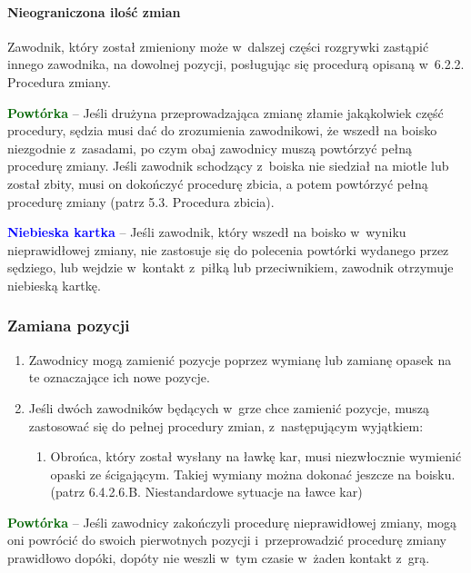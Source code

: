 \documentclass[12pt]{article}
\newcommand\bluecard[1]{\bgroup\textcolor{blue}{\textbf{#1}}}
\newcommand\other[1]{\bgroup\textcolor{darkgreen}{\textbf{#1}}}
\begin{document}
\paragraph{Nieograniczona ilość zmian}
Zawodnik, który został
zmieniony może w~dalszej części rozgrywki zastąpić innego zawodnika, na
dowolnej pozycji, posługując się procedurą opisaną w~6.2.2. Procedura
zmiany.

\other{Powtórka} -- Jeśli drużyna przeprowadzająca zmianę złamie
jakąkolwiek część procedury, sędzia musi dać do zrozumienia zawodnikowi,
że wszedł na boisko niezgodnie z~zasadami, po czym obaj zawodnicy muszą
powtórzyć pełną procedurę zmiany. Jeśli zawodnik schodzący z~boiska nie
siedział na miotle lub został zbity, musi on dokończyć procedurę zbicia,
a potem powtórzyć pełną procedurę zmiany (patrz 5.3. Procedura zbicia).

\bluecard{Niebieska kartka} -- Jeśli zawodnik, który wszedł na boisko w~wyniku nieprawidłowej zmiany, nie zastosuje się do polecenia powtórki
wydanego przez sędziego, lub wejdzie w~kontakt z~piłką lub
przeciwnikiem, zawodnik otrzymuje niebieską kartkę.

\subsubsection{Zamiana pozycji}

\begin{enumerate}
	\item
	      Zawodnicy mogą zamienić pozycje poprzez wymianę lub zamianę opasek na
	      te oznaczające ich nowe pozycje.
	\item
	      Jeśli dwóch zawodników będących w~grze chce zamienić pozycje, muszą
	      zastosować się do pełnej procedury zmian, z~następującym wyjątkiem:

	      \begin{enumerate}
		      \item
		            Obrońca, który został wysłany na ławkę kar, musi niezwłocznie
		            wymienić opaski ze ścigającym. Takiej wymiany można dokonać jeszcze
		            na boisku. (patrz 6.4.2.6.B. Niestandardowe sytuacje na ławce kar)
	      \end{enumerate}
\end{enumerate}

\other{Powtórka} -- Jeśli zawodnicy zakończyli procedurę nieprawidłowej
zmiany, mogą oni powrócić do swoich pierwotnych pozycji i~przeprowadzić
procedurę zmiany prawidłowo dopóki, dopóty nie weszli w~tym czasie w~żaden kontakt z~grą.
\end{document}
